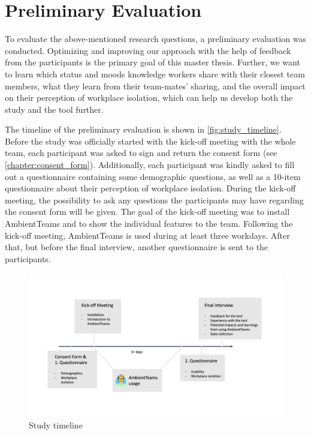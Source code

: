 \chapter{Preliminary Evaluation}
\label{chapter:preliminary_evaluation}
To evaluate the above-mentioned research questions, a preliminary evaluation was conducted. Optimizing and improving our approach with the help of feedback from the participants is the primary goal of this master thesis. Further, we want to learn which status and moods knowledge workers share with their closest team members, what they learn from their team-mates' sharing, and the overall impact on their perception of workplace isolation, which can help us develop both the study and the tool further.

The timeline of the preliminary evaluation is shown in \autoref{fig:study_timeline}. Before the study was officially started with the kick-off meeting with the whole team, each participant was asked to sign and return the consent form (see \autoref{chapter:consent_form}). Additionally, each participant was kindly asked to fill out a questionnaire containing some demographic questions, as well as a 10-item questionnaire about their perception of workplace isolation. During the kick-off meeting, the possibility to ask any questions the participants may have regarding the consent form will be given. The goal of the kick-off meeting was to install AmbientTeams and to show the individual features to the team. Following the kick-off meeting, AmbientTeams is used during at least three workdays. After that, but before the final interview, another questionnaire is sent to the participants.

\begin{figure}[h]
    \centering
    \includegraphics[width=.8\linewidth]{./images/Study_Timeline.png}
    \caption{Study timeline}
    \label{fig:study_timeline}
\end{figure}

